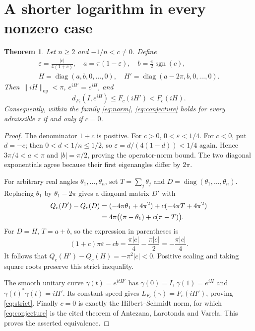 \documentclass[11pt]{article}
\newcommand{\diag}{\operatorname{diag}}
\newcommand{\op}{\mathrm{op}}
\newtheorem{theorem}{Theorem}
\begin{document}
\section{A shorter logarithm in every nonzero case}
\begin{theorem}\label{thm:family}
Let $n\geq2$ and $-1/n<c\ne0$. Define
\begin{gather*}
 \varepsilon=\frac{|c|}{4(1+c)},\quad
 a=\pi(1-\varepsilon),\quad b=\frac{\pi}{2}\operatorname{sgn}(c),\\
 H=\diag(a,b,0,\ldots,0),\quad
 H'=\diag(a-2\pi,b,0,\ldots,0).
\end{gather*}
Then $\|iH\|_{\op}<\pi$, $e^{iH'}=e^{iH}$, and
\begin{equation}\label{eq:strict}
 d_{F_c}(I,e^{iH})\leq F_c(iH')<F_c(iH).
\end{equation}
Consequently, within the family \eqref{eq:norm},
\eqref{eq:conjecture} holds for every admissible $z$ if and only if $c=0$.
\end{theorem}
\begin{proof}
The denominator $1+c$ is positive. For $c>0$,
$0<\varepsilon<1/4$. For $c<0$, put $d=-c$; then
$0<d<1/n\leq1/2$, so
$\varepsilon=d/(4(1-d))<1/4$ again.
Hence $3\pi/4<a<\pi$ and $|b|=\pi/2$, proving the operator-norm bound.
The two diagonal exponentials agree because their first eigenangles
differ by $2\pi$.

For arbitrary real angles $\theta_1,\ldots,\theta_n$, set
$T=\sum_j\theta_j$ and $D=\diag(\theta_1,\ldots,\theta_n)$.
Replacing $\theta_1$ by $\theta_1-2\pi$ gives a diagonal matrix $D'$ with
\begin{align}\label{eq:gap}
 Q_c(D')-Q_c(D)
 &=(-4\pi\theta_1+4\pi^2)
     +c(-4\pi T+4\pi^2)\notag\\
 &=4\pi\big((\pi-\theta_1)+c(\pi-T)\big).
\end{align}
For $D=H$, $T=a+b$, so the expression in parentheses is
\[
 (1+c)\pi\varepsilon-cb
 =\frac{\pi|c|}{4}-\frac{\pi|c|}{2}
 =-\frac{\pi|c|}{4}.
\]
It follows that $Q_c(H')-Q_c(H)=-\pi^2|c|<0$.
Positive scaling and taking square roots preserve this strict inequality.

The smooth unitary curve $\gamma(t)=e^{itH'}$ has
$\gamma(0)=I$, $\gamma(1)=e^{iH}$ and
$\gamma(t)^*\dot\gamma(t)=iH'$.
Its constant speed gives $L_{F_c}(\gamma)=F_c(iH')$, proving
\eqref{eq:strict}. Finally $c=0$ is exactly the Hilbert--Schmidt norm,
for which \eqref{eq:conjecture} is the cited theorem of
Antezana, Larotonda and Varela. This proves the asserted equivalence.
\end{proof}
\end{document}
